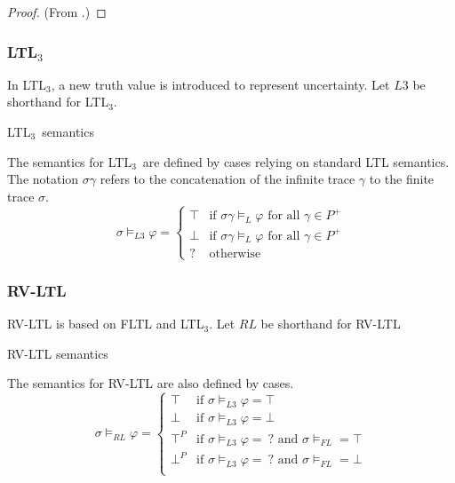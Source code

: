 \documentclass[a4paper]{article}
\newcommand{\tand}{\text{ and }}
\newcommand{\fall}{\text{ for all }}
\newcommand{\ltlt}{LTL$_3$}
\begin{document}
\begin{proof}
  (From \autocite{bauer2010comparing}.)
\end{proof}

\subsubsection{\ltlt} In \ltlt, a new truth value is introduced to represent uncertainty. Let $L3$ be shorthand for \ltlt.
\begin{defn}{\ltlt\ semantics}

  The semantics for \ltlt\ are defined by cases relying on standard LTL semantics. The notation $\sigma\gamma$ refers to the concatenation of the infinite trace $\gamma$ to the finite trace $\sigma$.
  \[\sigma\vDash_{L3}\varphi =
    \begin{cases}
      \top & \text{if } \sigma\gamma \vDash_L \varphi \fall \gamma \in P^+\\
      \bot & \text{if } \sigma\gamma \vDash_L \varphi \fall \gamma \in P^+\\
      ? & \text{otherwise}
    \end{cases}
    \]
\end{defn}

\subsubsection{RV-LTL} RV-LTL is based on FLTL and \ltlt. Let $RL$ be shorthand for RV-LTL
\begin{defn}{RV-LTL semantics}

  The semantics for RV-LTL are also defined by cases.
  \[\sigma\vDash_{RL}\varphi =
    \begin{cases}
      \top & \text{if } \sigma \vDash_{L3} \varphi = \top\\
      \bot & \text{if } \sigma \vDash_{L3} \varphi = \bot\\
      \top^P & \text{if } \sigma \vDash_{L3} \varphi = ~?\tand \sigma\vDash_{FL} = \top \\
      \bot^P & \text{if } \sigma \vDash_{L3} \varphi = ~?\tand \sigma\vDash_{FL} = \bot \\

    \end{cases}
  \]
\end{defn}
\end{document}
